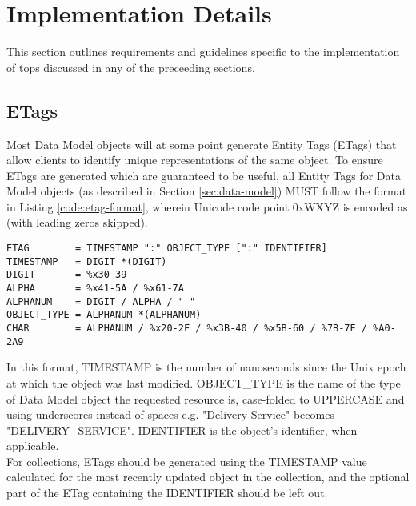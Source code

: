 %
%

\section{Implementation Details}
This section outlines requirements and guidelines specific to the
implementation of tops discussed in any of the preceeding sections.

\subsection{ETags\label{sec:etags}}
Most Data Model objects will at some point generate Entity Tags (ETags) that
allow clients to identify unique representations of the same object. To ensure
ETags are generated which are guaranteed to be useful, all Entity Tags for
Data Model objects (as described in Section \ref{sec:data-model}) MUST follow
the format in Listing \ref{code:etag-format}, wherein Unicode code point 0xWXYZ
is encoded as  (with leading zeros skipped).

\begin{codelisting}
\label{code:etag-format}
\begin{verbatim}
ETAG        = TIMESTAMP ":" OBJECT_TYPE [":" IDENTIFIER]
TIMESTAMP   = DIGIT *(DIGIT)
DIGIT       = %x30-39
ALPHA       = %x41-5A / %x61-7A
ALPHANUM    = DIGIT / ALPHA / "_"
OBJECT_TYPE = ALPHANUM *(ALPHANUM)
CHAR        = ALPHANUM / %x20-2F / %x3B-40 / %x5B-60 / %7B-7E / %A0-2A9
\end{verbatim}
\end{codelisting}

In this format, TIMESTAMP is the number of nanoseconds since the Unix epoch at
which the object was last modified. OBJECT\_TYPE is the name of the type of
Data Model object the requested resource is, case-folded to UPPERCASE and using
underscores instead of spaces e.g. "Delivery Service" becomes
"DELIVERY\_SERVICE". IDENTIFIER is the object's identifier, when applicable.\\
For collections, ETags should be generated using the TIMESTAMP value calculated
for the most recently updated object in the collection, and the optional part
of the ETag containing the IDENTIFIER should be left out.
